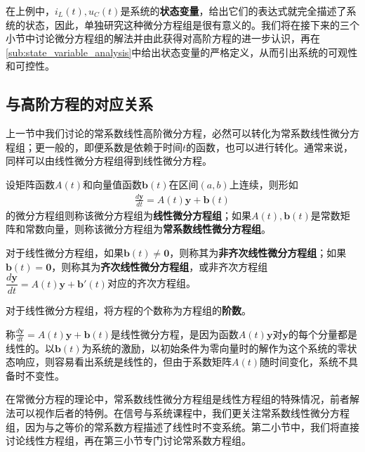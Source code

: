 \documentclass{ctexbook}
\begin{document}
在上例中，$i_L(t),u_C(t)$是系统的\textbf{状态变量}，给出它们的表达式就完全描述了系统的状态，因此，单独研究这种微分方程组是很有意义的。我们将在接下来的三个小节中讨论微分方程组的解法并由此获得对高阶方程的进一步认识，再在\ref{sub:state_variable_analysis}中给出状态变量的严格定义，从而引出系统的可观性和可控性。

\subsection{与高阶方程的对应关系}\label{sub:compare_to_high_order}

上一节中我们讨论的常系数线性高阶微分方程，必然可以转化为常系数线性微分方程组；更一般的，即便系数是依赖于时间$t$的函数，也可以进行转化。通常来说，同样可以由线性微分方程组得到线性微分方程。

\begin{definition}[线性微分方程组]
    设矩阵函数$A(t)$和向量值函数$\mathbf{b}(t)$在区间$(a,b)$上连续，则形如\begin{align*}
    \frac{d\mathbf{y}}{dt}=A(t)\mathbf{y}+\mathbf{b}(t)
    \end{align*}
    的微分方程组则称该微分方程组为\textbf{线性微分方程组}；如果$A(t),\mathbf{b}(t)$是常数矩阵和常数向量，则称该微分方程组为\textbf{常系数线性微分方程组}。
\end{definition}

\begin{definition}
    对于线性微分方程组，如果$\mathbf{b}(t)\neq\mathbf{0}$，则称其为\textbf{非齐次线性微分方程组}；如果$\mathbf{b}(t)= \mathbf{0}$，则称其为\textbf{齐次线性微分方程组}，或非齐次方程组$\dfrac{d\mathbf{y}}{dt}=A(t)\mathbf{y}+\mathbf{b}'(t)$对应的齐次方程组。
\end{definition}
\begin{definition}
    对于线性微分方程组，将方程的个数称为方程组的\textbf{阶数}。
\end{definition}

称$\frac{d\mathbf{y}}{dt}=A(t)\mathbf{y}+\mathbf{b}(t)$是线性微分方程，是因为函数$A(t)\mathbf{y}$对$\mathbf{y}$的每个分量都是线性的。以$\mathbf{b}(t)$为系统的激励，以初始条件为零向量时的解作为这个系统的零状态响应，则容易看出系统是线性的，但由于系数矩阵$A(t)$随时间变化，系统不具备时不变性。

在常微分方程的理论中，常系数线性微分方程组是线性方程组的特殊情况，前者解法可以视作后者的特例。在信号与系统课程中，我们更关注常系数线性微分方程组，因为与之等价的常系数方程描述了线性时不变系统。第二小节中，我们将直接讨论线性方程组，再在第三小节专门讨论常系数方程组。
\end{document}
